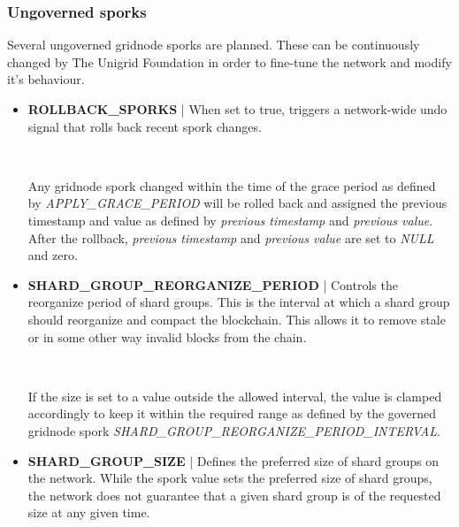 \documentclass[10pt,a4paper,final]{article}
\newcommand{\colorbitbox}[3]{%
  \rlap{\bitbox{#2}{\color{#1}\rule{\width}{\height}}}%
  \bitbox{#2}{#3}
}
\begin{document}
\subsubsection{Ungoverned sporks}
Several ungoverned \gls{gridnode} sporks are planned. These can be continuously changed by The Unigrid Foundation in order to fine-tune the network and modify it's behaviour.

\begin{itemize}
\item \textbf{ROLLBACK\_SPORKS} | When set to true, triggers a network-wide undo signal that rolls back recent spork changes.

\medskip
\begin{bytefield}[bitwidth=0.5em]{64}
	 \\
	\colorbitbox{lightgray}{63}{reserved}
\end{bytefield}

Any \gls{gridnode} spork changed within the time of the grace period as defined by \emph{APPLY\_GRACE\_PERIOD} will be rolled back and assigned the previous timestamp and value as defined by \emph{previous timestamp} and \emph{previous value}. After the rollback, \emph{previous timestamp} and \emph{previous value} are set to \emph{NULL} and zero.

\item \textbf{SHARD\_GROUP\_REORGANIZE\_PERIOD} | Controls the reorganize period of shard groups. This is the interval at which a shard group should reorganize and compact the blockchain. This allows it to remove stale or in some other way invalid blocks from the chain.

\medskip
\begin{bytefield}[bitwidth=0.5em]{64}
	 \\
	\colorbitbox{lightgray}{32}{reserved}
\end{bytefield}

If the size is set to a value outside the allowed interval, the value is clamped accordingly to keep it within the required range as defined by the governed \gls{gridnode} spork \emph{SHARD\_GROUP\_REORGANIZE\_PERIOD\_INTERVAL}.

\item \textbf{SHARD\_GROUP\_SIZE} | Defines the preferred size of shard groups on the network. While the spork value sets the preferred size of shard groups, the network does not guarantee that a given shard group is of the requested size at any given time.


\end{itemize}
\end{document}
